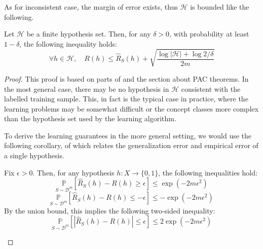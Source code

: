 As for inconsistent case, the margin of error exists, thus $\mathcal{H}$ is bounded like the following. 

\begin{theorem}\label{thm:theorem_inconsistent}
    Let $\mathcal{H}$ be a finite hypothesis set. Then, for any $\delta > 0$, with probability at least $1-\delta$, the following inequality holds: 
    \begin{equation}
        \forall h \in \mathcal{H}, \quad R(h) \leq \hat{R}_S (h) + \sqrt{\frac{\log{|\mathcal{H}|}+ \log{2/\delta}}{2m}}
    \end{equation}
\end{theorem}

\begin{proof}
    This proof is based on parts of \cite{10.5555/2371238} and the section about PAC theorems. In the most general case, there may be no hypothesis in $\mathcal{H}$ consistent with the labelled training sample. This, in fact is the typical case in practice, where the learning problems may be somewhat difficult or the concept classes more complex than the hypothesis set used by the learning algorithm. 

To derive the learning guarantees in the more general setting, we would use the following corollary, of which relates the generalization error and empirical error of a single hypothesis. 

\begin{col}
    Fix $\epsilon > 0$. Then, for any hypothesis $h: X \to \{0,1\}$, the following inequalities hold: 
    \begin{equation}
        \underset{S\sim \mathcal{D}^m}{\mathbb{P}} \left[\hat{R}_S (h) - R(h) \geq \epsilon\right] \leq \exp{(-2m\epsilon^2)}
    \end{equation}
    \begin{equation}
        \underset{S\sim \mathcal{D}^m}{\mathbb{P}} \left[\hat{R}_S (h) - R(h) \leq -\epsilon\right] \leq -\exp{(-2m\epsilon^2)}
    \end{equation}
    By the union bound, this implies the following two-sided inequality: 
    \begin{equation}
        \underset{S\sim \mathcal{D}^m}{\mathbb{P}} \left[|\hat{R}_S (h) - R(h)| \leq \epsilon\right] \leq 2\exp{(-2m\epsilon^2)}
    \end{equation}
\end{col}


\end{proof}
